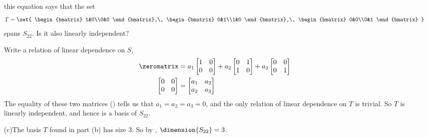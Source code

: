 %
this equation says that the set
%
\begin{equation*}
T=\set{
\begin{bmatrix}
1&0\\0&0
\end{bmatrix},\,
\begin{bmatrix}
0&1\\1&0
\end{bmatrix},\,
\begin{bmatrix}
0&0\\0&1
\end{bmatrix}
}
%
\end{equation*}
%
spans $S_{22}$.  Is it also linearly independent?\par
%
Write a relation of linear dependence on $S$,
%
\begin{align*}
\zeromatrix&=
a_1
\begin{bmatrix}
1&0\\0&0
\end{bmatrix}+
a_2
\begin{bmatrix}
0&1\\1&0
\end{bmatrix}+
a_3
\begin{bmatrix}
0&0\\0&1
\end{bmatrix}\\
%
\begin{bmatrix}
0&0\\0&0
\end{bmatrix}
&=
\begin{bmatrix}
a_1&a_2\\a_2&a_3
\end{bmatrix}
\end{align*}
%
The equality of these two matrices () tells us that $a_1=a_2=a_3=0$, and the only relation of linear dependence on $T$ is trivial.  So $T$ is linearly independent, and hence is a basis of $S_{22}$.\par
%
(c)\quad The basis $T$ found in part (b) has size 3.  So by , $\dimension{S_{22}}=3$.

